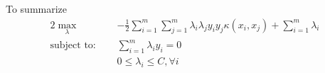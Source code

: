 \documentclass{article}
\begin{document}
		To summarize
		\begin{alignat}{2}
			\max_{\lambda} \quad & -\frac{1}{2} \sum_{i=1}^{m}\sum_{j=1}^{m} \lambda_i\lambda_j y_i y_j \kappa(x_i, x_j) + \sum_{i=1}^{m} \lambda_i \\
			\text{subject to: } \quad & \sum_{i=1}^{m}\lambda_i y_i = 0 \\
			& 0\leq \lambda_i \leq C, \forall i \\
		\end{alignat}
\end{document}
